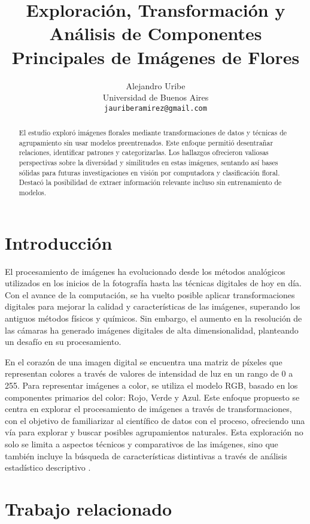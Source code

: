 \documentclass{article}
\title{Exploración, Transformación y Análisis de Componentes Principales de Imágenes de Flores}
\author{
  Alejandro Uribe\\
  Universidad de Buenos Aires\\
  \texttt{jauriberamirez@gmail.com}
}
\begin{document}
\maketitle


\begin{abstract}
  El estudio exploró imágenes florales mediante transformaciones de datos y técnicas de agrupamiento sin usar modelos preentrenados. Este enfoque permitió desentrañar relaciones, identificar patrones y categorizarlas. Los hallazgos ofrecieron valiosas perspectivas sobre la diversidad y similitudes en estas imágenes, sentando así bases sólidas para futuras investigaciones en visión por computadora y clasificación floral. Destacó la posibilidad de extraer información relevante incluso sin entrenamiento de modelos.
\end{abstract}


\section{Introducción}

El procesamiento de imágenes ha evolucionado desde los métodos analógicos utilizados en los inicios de la fotografía hasta las técnicas digitales de hoy en día. Con el avance de la computación, se ha vuelto posible aplicar transformaciones digitales para mejorar la calidad y características de las imágenes, superando los antiguos métodos físicos y químicos. Sin embargo, el aumento en la resolución de las cámaras ha generado imágenes digitales de alta dimensionalidad, planteando un desafío en su procesamiento.

En el corazón de una imagen digital se encuentra una matriz de píxeles que representan colores a través de valores de intensidad de luz en un rango de 0 a 255. Para representar imágenes a color, se utiliza el modelo RGB, basado en los componentes primarios del color: Rojo, Verde y Azul. Este enfoque propuesto se centra en explorar el procesamiento de imágenes a través de transformaciones, con el objetivo de familiarizar al científico de datos con el proceso, ofreciendo una vía para explorar y buscar posibles agrupamientos naturales. Esta exploración no solo se limita a aspectos técnicos y comparativos de las imágenes, sino que también incluye la búsqueda de características distintivas a través de análisis estadístico descriptivo \cite{HandsonML, NEURIPS2021_6d9cb7de}.

\section{Trabajo relacionado}
\end{document}

